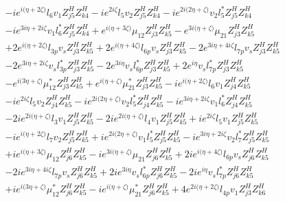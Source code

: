 \begin{align}
 &-i e^{i \Big(\eta +2 \zeta \Big)} l_6 v_1 Z_{{j 5}}^{H} Z_{{k 4}}^{H} -i e^{2 i \zeta } l_5 v_2 Z_{{j 5}}^{H} Z_{{k 4}}^{H} -i e^{2 i \Big(2 \eta +\zeta \Big)} v_2 l_5^* Z_{{j 5}}^{H} Z_{{k 4}}^{H} \nonumber \\ 
 &-i e^{3 i \eta +2 i \zeta } v_1 l_6^* Z_{{j 5}}^{H} Z_{{k 4}}^{H} +e^{i \Big(\eta +3 \zeta \Big)} \mu_{12} Z_{{j 3}}^{H} Z_{{k 5}}^{H} - e^{3 i \Big(\eta +\zeta \Big)} \mu_{21} Z_{{j 3}}^{H} Z_{{k 5}}^{H} \nonumber \\ 
 &+2 e^{i \Big(\eta +2 \zeta \Big)} l_{3p} v_s Z_{{j 3}}^{H} Z_{{k 5}}^{H} +2 e^{i \Big(\eta +4 \zeta \Big)} l_{6p} v_s Z_{{j 3}}^{H} Z_{{k 5}}^{H} -2 e^{3 i \eta +4 i \zeta } l_{7p} v_s Z_{{j 3}}^{H} Z_{{k 5}}^{H} \nonumber \\ 
 &-2 e^{3 i \eta +2 i \zeta } v_s l_{3p}^* Z_{{j 3}}^{H} Z_{{k 5}}^{H} -2 e^{3 i \eta } v_s l_{6p}^* Z_{{j 3}}^{H} Z_{{k 5}}^{H} +2 e^{i \eta } v_s l_{7p}^* Z_{{j 3}}^{H} Z_{{k 5}}^{H} \nonumber \\ 
 &- e^{i \Big(3 \eta +\zeta \Big)} \mu_{12}^* Z_{{j 3}}^{H} Z_{{k 5}}^{H} +e^{i \Big(\eta +\zeta \Big)} \mu_{21}^* Z_{{j 3}}^{H} Z_{{k 5}}^{H} -i e^{i \Big(\eta +2 \zeta \Big)} l_6 v_1 Z_{{j 4}}^{H} Z_{{k 5}}^{H} \nonumber \\ 
 &-i e^{2 i \zeta } l_5 v_2 Z_{{j 4}}^{H} Z_{{k 5}}^{H} -i e^{2 i \Big(2 \eta +\zeta \Big)} v_2 l_5^* Z_{{j 4}}^{H} Z_{{k 5}}^{H} -i e^{3 i \eta +2 i \zeta } v_1 l_6^* Z_{{j 4}}^{H} Z_{{k 5}}^{H} \nonumber \\ 
 &-2 i e^{2 i \Big(\eta +\zeta \Big)} l_3 v_1 Z_{{j 5}}^{H} Z_{{k 5}}^{H} -2 i e^{2 i \Big(\eta +\zeta \Big)} l_4 v_1 Z_{{j 5}}^{H} Z_{{k 5}}^{H} +i e^{2 i \zeta } l_5 v_1 Z_{{j 5}}^{H} Z_{{k 5}}^{H} \nonumber \\ 
 &-i e^{i \Big(\eta +2 \zeta \Big)} l_7 v_2 Z_{{j 5}}^{H} Z_{{k 5}}^{H} +i e^{2 i \Big(2 \eta +\zeta \Big)} v_1 l_5^* Z_{{j 5}}^{H} Z_{{k 5}}^{H} -i e^{3 i \eta +2 i \zeta } v_2 l_7^* Z_{{j 5}}^{H} Z_{{k 5}}^{H} \nonumber \\ 
 &+i e^{i \Big(\eta +3 \zeta \Big)} \mu_{12} Z_{{j 6}}^{H} Z_{{k 5}}^{H} -i e^{3 i \Big(\eta +\zeta \Big)} \mu_{21} Z_{{j 6}}^{H} Z_{{k 5}}^{H} +2 i e^{i \Big(\eta +4 \zeta \Big)} l_{6p} v_s Z_{{j 6}}^{H} Z_{{k 5}}^{H} \nonumber \\ 
 &-2 i e^{3 i \eta +4 i \zeta } l_{7p} v_s Z_{{j 6}}^{H} Z_{{k 5}}^{H} +2 i e^{3 i \eta } v_s l_{6p}^* Z_{{j 6}}^{H} Z_{{k 5}}^{H} -2 i e^{i \eta } v_s l_{7p}^* Z_{{j 6}}^{H} Z_{{k 5}}^{H} \nonumber \\ 
 &+i e^{i \Big(3 \eta +\zeta \Big)} \mu_{12}^* Z_{{j 6}}^{H} Z_{{k 5}}^{H} -i e^{i \Big(\eta +\zeta \Big)} \mu_{21}^* Z_{{j 6}}^{H} Z_{{k 5}}^{H} +4 e^{2 i \Big(\eta +2 \zeta \Big)} l_{4p} v_1 Z_{{j 3}}^{H} Z_{{k 6}}^{H} \nonumber \\ 

\end{align}
